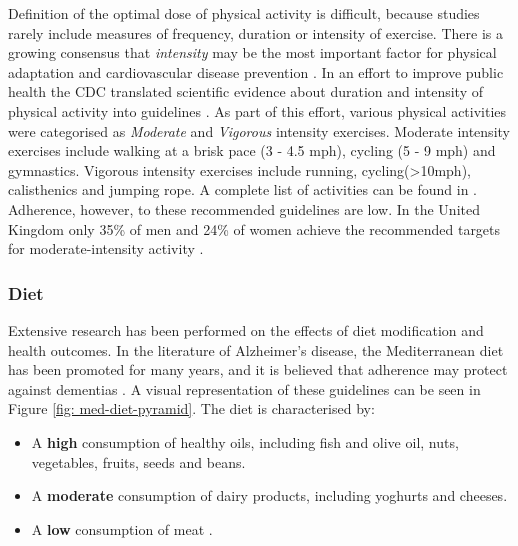 Definition of the optimal dose of physical activity is difficult, because studies rarely include measures of frequency, duration or intensity of exercise. There is a growing consensus that \textit{intensity} may be the most important factor for physical adaptation and cardiovascular disease prevention \cite{Kaminsky2014,Wilson2015,Weston2014}. In an effort to improve public health the CDC translated scientific evidence about duration and intensity of physical activity into guidelines \cite{CDC_translating}. As part of this effort, various physical activities were categorised as \textit{Moderate} and \textit{Vigorous} intensity exercises. Moderate intensity exercises include walking at a brisk pace (3 - 4.5 mph), cycling (5 - 9 mph) and gymnastics. Vigorous intensity exercises include running, cycling(\textgreater 10mph), calisthenics and jumping rope. A complete list of activities can be found in \cite{cdcpaguidelines2008}.
Adherence, however, to these recommended guidelines are low. In the United Kingdom only 35\% of men and 24\% of women achieve the recommended targets for moderate-intensity activity \cite{Miles2007}.

\subsubsection{Diet}
Extensive research has been performed on the effects of diet modification and health outcomes. In the literature of Alzheimer's disease, the Mediterranean diet has been promoted for many years, and it is believed that adherence may protect against dementias \cite{Trichopoulou2014, Psaltopoulou2013}. A visual representation of these guidelines can be seen in Figure \ref{fig: med-diet-pyramid}. The diet is characterised by:
\begin{itemize}
\item A \textbf{high} consumption of healthy oils, including fish and olive oil, nuts, vegetables, fruits, seeds and beans.
\item A \textbf{moderate} consumption of dairy products, including yoghurts and cheeses.
\item A \textbf{low} consumption of meat \cite{Gu2010a}.
\end{itemize}

